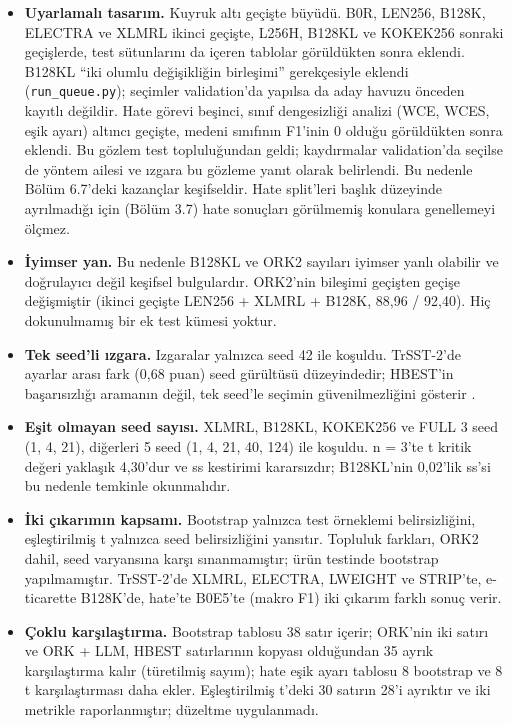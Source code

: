 \documentclass[11pt]{article}
\begin{document}
\begin{itemize}
\item \textbf{Uyarlamalı tasarım.} Kuyruk altı geçişte büyüdü. B0R, LEN256, B128K, ELECTRA ve XLMRL ikinci geçişte, L256H, B128KL ve KOKEK256 sonraki geçişlerde, test sütunlarını da içeren tablolar görüldükten sonra eklendi. B128KL ``iki olumlu değişikliğin birleşimi'' gerekçesiyle eklendi (\texttt{run\_\allowbreak{}\allowbreak{}queue.\allowbreak{}\allowbreak{}py}); seçimler validation'da yapılsa da aday havuzu önceden kayıtlı değildir. Hate görevi beşinci, sınıf dengesizliği analizi (WCE, WCES, eşik ayarı) altıncı geçişte, medeni sınıfının F1'inin 0 olduğu görüldükten sonra eklendi. Bu gözlem test topluluğundan geldi; kaydırmalar validation'da seçilse de yöntem ailesi ve ızgara bu gözleme yanıt olarak belirlendi. Bu nedenle Bölüm 6.7'deki kazançlar keşifseldir. Hate split'leri başlık düzeyinde ayrılmadığı için (Bölüm 3.7) hate sonuçları görülmemiş konulara genellemeyi ölçmez.
\item \textbf{İyimser yan.} Bu nedenle B128KL ve ORK2 sayıları iyimser yanlı olabilir ve doğrulayıcı değil keşifsel bulgulardır. ORK2'nin bileşimi geçişten geçişe değişmiştir (ikinci geçişte LEN256 + XLMRL + B128K, 88,96 / 92,40). Hiç dokunulmamış bir ek test kümesi yoktur.
\item \textbf{Tek seed'li ızgara.} Izgaralar yalnızca seed 42 ile koşuldu. TrSST-2'de ayarlar arası fark (0,68 puan) seed gürültüsü düzeyindedir; HBEST'in başarısızlığı aramanın değil, tek seed'le seçimin güvenilmezliğini gösterir \citep{dodge2020}.
\item \textbf{Eşit olmayan seed sayısı.} XLMRL, B128KL, KOKEK256 ve FULL 3 seed (1, 4, 21), diğerleri 5 seed (1, 4, 21, 40, 124) ile koşuldu. n = 3'te t kritik değeri yaklaşık 4,30'dur ve ss kestirimi kararsızdır; B128KL'nin 0,02'lik ss'si bu nedenle temkinle okunmalıdır.
\item \textbf{İki çıkarımın kapsamı.} Bootstrap yalnızca test örneklemi belirsizliğini, eşleştirilmiş t yalnızca seed belirsizliğini yansıtır. Topluluk farkları, ORK2 dahil, seed varyansına karşı sınanmamıştır; ürün testinde bootstrap yapılmamıştır. TrSST-2'de XLMRL, ELECTRA, LWEIGHT ve STRIP'te, e-ticarette B128K'de, hate'te B0E5'te (makro F1) iki çıkarım farklı sonuç verir.
\item \textbf{Çoklu karşılaştırma.} Bootstrap tablosu 38 satır içerir; ORK'nin iki satırı ve ORK + LLM, HBEST satırlarının kopyası olduğundan 35 ayrık karşılaştırma kalır (türetilmiş sayım); hate eşik ayarı tablosu 8 bootstrap ve 8 t karşılaştırması daha ekler. Eşleştirilmiş t'deki 30 satırın 28'i ayrıktır ve iki metrikle raporlanmıştır; düzeltme uygulanmadı.

\end{itemize}
\end{document}
